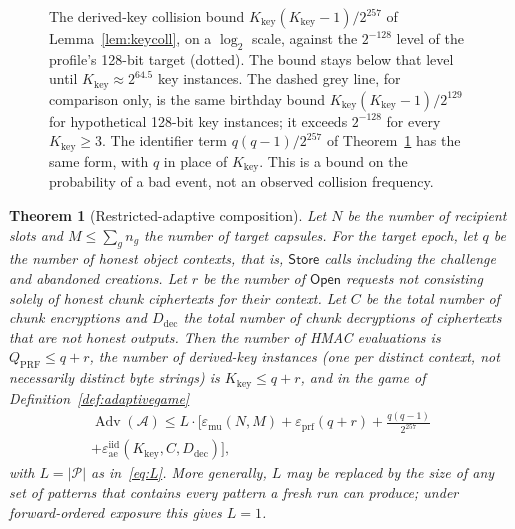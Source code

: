 \documentclass[pdflatex,sn-mathphys-num]{sn-jnl}%
\theoremstyle{plain}
\newtheorem{theorem}{Theorem}
\theoremstyle{definition}
\newcommand{\Adv}{\operatorname{Adv}}
\begin{document}
\begin{figure}[htbp]
\centering
\figbox{}
\caption{The derived-key collision bound $K_{\mathrm{key}}(K_{\mathrm{key}}-1)/2^{257}$ of Lemma~\ref{lem:keycoll}, on a $\log_2$ scale, against the $2^{-128}$ level of the profile's 128-bit target (dotted). The bound stays below that level until $K_{\mathrm{key}}\approx2^{64.5}$ key instances. The dashed grey line, for comparison only, is the same birthday bound $K_{\mathrm{key}}(K_{\mathrm{key}}-1)/2^{129}$ for hypothetical 128-bit key instances; it exceeds $2^{-128}$ for every $K_{\mathrm{key}}\ge3$. The identifier term $q(q-1)/2^{257}$ of Theorem~\ref{thm:adaptive} has the same form, with $q$ in place of $K_{\mathrm{key}}$. This is a bound on the probability of a bad event, not an observed collision frequency.}\label{fig:keycoll}
\end{figure}

\begin{keyresult}
\begin{theorem}[Restricted-adaptive composition]\label{thm:adaptive}
Let $N$ be the number of recipient slots and $M\le\sum_gn_g$ the number of target capsules. For the target epoch, let $q$ be the number of honest object contexts, that is, $\mathsf{Store}$ calls including the challenge and abandoned creations. Let $r$ be the number of $\mathsf{Open}$ requests not consisting solely of honest chunk ciphertexts for their context. Let $C$ be the total number of chunk encryptions and $D_{\mathrm{dec}}$ the total number of chunk decryptions of ciphertexts that are not honest outputs. Then the number of HMAC evaluations is $Q_{\mathrm{PRF}}\le q+r$, the number of derived-key \emph{instances} (one per distinct context, not necessarily distinct byte strings) is $K_{\mathrm{key}}\le q+r$, and in the game of Definition~\ref{def:adaptivegame}
\begin{multline}\label{eq:adaptive}
 \Adv(\mathcal A)\le L\cdot\Big[\varepsilon_{\mathrm{mu}}(N,M)+\varepsilon_{\mathrm{prf}}(q+r)+\frac{q(q-1)}{2^{257}}\\
 +\varepsilon^{\mathrm{iid}}_{\mathrm{ae}}(K_{\mathrm{key}},C,D_{\mathrm{dec}})\Big],
\end{multline}
with $L=|\mathcal P|$ as in~\eqref{eq:L}. More generally, $L$ may be replaced by the size of any set of patterns that contains every pattern a fresh run can produce; under forward-ordered exposure this gives $L=1$.
\end{theorem}
\end{keyresult}
\end{document}
